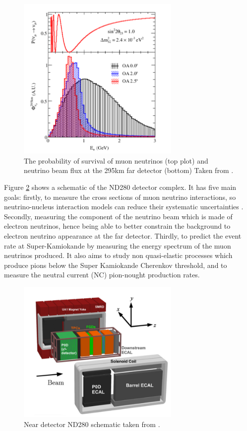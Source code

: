 \begin{figure}
    \centering
    \includegraphics[width=0.7\textwidth]{Figures/nuprobosc.png}
    \caption{The probability of survival of muon neutrinos (top plot) and neutrino beam flux at the 295km far detector (bottom) Taken from \cite{t2k_collaboration_t2k_2013}.}
    \label{fig:nuprobosc}
\end{figure}

Figure \ref{fig:ND280_schematic} shows a schematic of the ND280 detector complex. It has five main goals: firstly, to measure the cross sections of muon neutrino interactions, so neutrino-nucleus interaction models can reduce their systematic uncertainties \cite{abe2015measurement}. Secondly, measuring the component of the neutrino beam which is made of electron neutrinos, hence being able to better constrain the background to electron neutrino appearance at the far detector. Thirdly, to predict the event rate at Super-Kamiokande by measuring the energy spectrum of the muon neutrinos produced. It also aims to study non quasi-elastic processes which produce pions below the Super Kamiokande Cherenkov threshold, and to measure the neutral current (NC) pion-nought production rates. 

\begin{figure}
    \centering
    \includegraphics[width=0.7\textwidth]{Figures/nd280_complex.png}
    \caption{Near detector ND280 schematic taken from \cite{t2k_collaboration_t2k_2011}.}
    \label{fig:ND280_schematic}
\end{figure}

